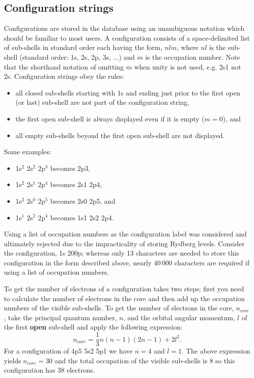 \subsection{Configuration strings}

Configurations are stored in the database using an unambiguous notation which
should be familiar to most users.
A configuration consists of a space-delimited list of sub-shells in standard
order each having the form, $nlm$, where $nl$ is the sub-shell (standard order: 1s, 
2s, 2p, 3s, ...) and $m$ is the occupation number.
Note that the shorthand notation of omitting $m$ when unity is not used, e.g. 
2s1 not 2s.
Configuration strings obey the rules:
\begin{itemize}
\item all closed sub-shells starting with 1s and ending just prior to the first
      open (or last) sub-shell are not part of the configuration string,
\item the first open sub-shell is always displayed even if it is empty ($m=0$),
      and
\item all empty sub-shells beyond the first open sub-shell are not 
      displayed.
\end{itemize} 
Some examples:
\begin{itemize}
\item 1s$^2$ 2s$^2$ 2p$^3$ becomes 2p3,
\item 1s$^2$ 2s$^1$ 2p$^4$ becomes 2s1 2p4,
\item 1s$^2$ 2s$^0$ 2p$^5$ becomes 2s0 2p5, and
\item 1s$^1$ 2s$^2$ 2p$^4$ becomes 1s1 2s2 2p4.
\end{itemize}

Using a list of occupation numbers as the configuration label was considered
and ultimately rejected due to the impracticality of storing Rydberg levels.
Consider the configuration, 1s 200p; whereas only 13 characters are
needed to store this configuration in the form described above, nearly 
40\,000 characters are required if using a list of occupation numbers.

To get the number of electrons of a configuration takes two steps; first you
need to calculate the number of electrons in the core and then add up the
occupation numbers of the visible sub-shells.
To get the number of electrons in the core, $n_{core}$, take the principal
quantum number, $n$, and the orbital angular momentum, $l$ of the first 
{\bf open} sub-shell and apply the following expression:
\begin{equation}
n_{core} = \frac{1}{3} n (n-1) (2n-1) + 2l^2 .
\end{equation}
For a configuration of 4p5 5s2 5p1 we have $n=4$ and $l=1$.
The above expression yields $n_{core} = 30$ and the total occupation of the
visible sub-shells is 8 so this configuration has 38 electrons.


